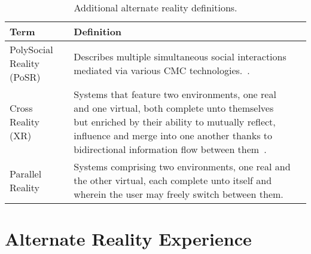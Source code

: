 \begin{table}[h]
\begin{center}
\begin{tabularx}{\textwidth}{l *{2}{>{\centering\arraybackslash}X}}

\toprule

\textbf{Term} & \textbf{Definition} \\

\midrule

		
PolySocial Reality (PoSR) & Describes multiple simultaneous social interactions mediated via various CMC technologies.~\cite{Applin2012}. \\

\midrule


Cross Reality (XR) & Systems that feature two environments, one real and one virtual, both complete unto themselves~\cite{lifton:merging} but enriched by their ability to mutually reflect, influence and merge into one another thanks to bidirectional information flow between them~\cite{kim:practical}. \\

\midrule


Parallel Reality & Systems comprising two environments, one real and the other virtual, each complete unto itself and wherein the user may freely switch between them. \\


\bottomrule
\end{tabularx}
\end{center}
\caption{Additional alternate reality definitions.}
\label{additional-alternate-reality-definitions}
\end{table}


\section{Alternate Reality Experience}

